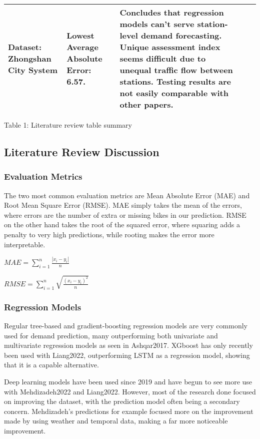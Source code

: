 \documentclass{article}
\begin{document}
\begin{center}
\begin{longtable}{ | m{4em} | m{14em} | m{14em} | m{13em} | m{17em} |}
    \textbf{Dataset:} Zhongshan City System
    &
    Lowest Average Absolute Error: 6.57.
    &
      \newline
    Concludes that regression models can’t serve station-level demand forecasting.
    Unique assessment index seems difficult due to unequal traffic flow between stations.
    Testing results are not easily comparable with other papers.

    \\

    \hline    
\end{longtable}
\caption{\footnotesize Table 1: Literature review table summary}
\end{center}

\subsection{Literature Review Discussion}

\subsubsection{Evaluation Metrics}
The two most common evaluation metrics are Mean Absolute Error (MAE) and Root Mean Square Error (RMSE). MAE simply takes the mean of the errors, where errors are the number of extra or missing bikes in our prediction. RMSE on the other hand takes the root of the squared error, where squaring adds a penalty to very high predictions, while rooting makes the error more interpretable.

$MAE = \sum_{i=1}^{n}\frac{|x_i-y_i|}{n}$

$RMSE = \sum_{i=1}^{n}\sqrt{\frac{(x_i-y_i)^2}{n}}$

\subsubsection{Regression Models}

Regular tree-based and gradient-boosting regression models are very commonly used for demand prediction, many outperforming both univariate and multivariate regression models as seen in Ashqar2017\cite{Ashqar2017}. XGboost has only recently been used with Liang2022\cite{Liang2022}, outperforming LSTM as a regression model, showing that it is a capable alternative.

Deep learning models have been used since 2019\cite{guo2019} and have begun to see more use with Mehdizadeh2022\cite{Mehdi2022} and Liang2022\cite{Liang2022}. However, most of the research done focused on improving the dataset, with the prediction model often being a secondary concern. Mehdizadeh's predictions for example focused more on the improvement made by using weather and temporal data, making a far more noticeable improvement. 
\end{document}
